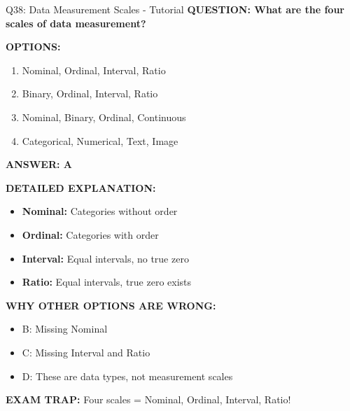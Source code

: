 \documentclass[8pt]{beamer}
\begin{document}
	\begin{frame}{Q38: Data Measurement Scales - Tutorial}
		\fontsize{6.5}{7.5}\selectfont
		\textbf{QUESTION: What are the four scales of data measurement?}
		
		\vspace{0.1cm}
		\textbf{OPTIONS:}
		\begin{enumerate}
			\item Nominal, Ordinal, Interval, Ratio
			\item Binary, Ordinal, Interval, Ratio
			\item Nominal, Binary, Ordinal, Continuous
			\item Categorical, Numerical, Text, Image
		\end{enumerate}
		
		\vspace{0.1cm}
		\textcolor{myblue}{\textbf{ANSWER: A}}
		
		\vspace{0.1cm}
		\textbf{DETAILED EXPLANATION:}
		\begin{itemize}
			\item \textbf{Nominal:} Categories without order
			\item \textbf{Ordinal:} Categories with order
			\item \textbf{Interval:} Equal intervals, no true zero
			\item \textbf{Ratio:} Equal intervals, true zero exists
		\end{itemize}
		
		\vspace{0.1cm}
		\textcolor{myred}{\textbf{WHY OTHER OPTIONS ARE WRONG:}}
		\begin{itemize}
			\item \textcolor{myred}{B:} Missing Nominal
			\item \textcolor{myred}{C:} Missing Interval and Ratio
			\item \textcolor{myred}{D:} These are data types, not measurement scales
		\end{itemize}
		
		\textcolor{myred}{\textbf{EXAM TRAP:}} Four scales = \textcolor{myblue}{Nominal, Ordinal, Interval, Ratio}!
	\end{frame}
	
\end{document}

